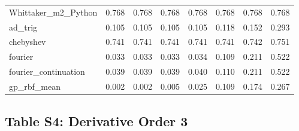 \begin{longtable}{lrrrrrrr}
Whittaker\_m2\_Python & 0.768 & 0.768 & 0.768 & 0.768 & 0.768 & 0.768 & 0.768 \\
ad\_trig & 0.105 & 0.105 & 0.105 & 0.105 & 0.118 & 0.152 & 0.293 \\
chebyshev & 0.741 & 0.741 & 0.741 & 0.741 & 0.741 & 0.742 & 0.751 \\
fourier & 0.033 & 0.033 & 0.033 & 0.034 & 0.109 & 0.211 & 0.522 \\
fourier\_continuation & 0.039 & 0.039 & 0.039 & 0.040 & 0.110 & 0.211 & 0.522 \\
gp\_rbf\_mean & 0.002 & 0.002 & 0.005 & 0.025 & 0.109 & 0.174 & 0.267 \\
\bottomrule
\end{longtable}

\clearpage

\subsection*{Table S4: Derivative Order 3}

